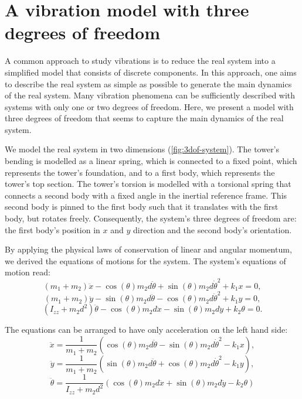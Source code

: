 \documentclass{article}
\begin{document}
\clearpage

\section{A vibration model with three degrees of freedom}
\label{sec:3dof}

A common approach to study vibrations is to reduce the real system into a simplified model that consists of discrete components. In this approach, one aims to describe the real system as simple as possible to generate the main dynamics of the real system. Many vibration phenomena can be sufficiently described with systems with only one or two degrees of freedom. Here, we present a model with three degrees of freedom that seems to capture the main dynamics of the real system.
\par 
We model the real system in two dimensions (\autoref{fig:3dof-system}). The tower's bending is modelled as a linear spring, which is connected to a fixed point, which represents the tower's foundation, and to a first body, which represents the tower's top section. The tower's torsion is modelled with a torsional spring that connects a second body with a fixed angle in the inertial reference frame. This second body is pinned to the first body such that it translates with the first body, but rotates freely. Consequently, the system's three degrees of freedom are: the first body's position in $x$ and $y$ direction and the second body's orientation.
\par 
By applying the physical laws of conservation of linear and angular momentum, we derived the equations of motions for the system. The system's equations of motion read:
\begin{equation}
    (m_1 + m_2) \ddot{x} - \cos(\theta) m_2 d \ddot{\theta} + \sin(\theta) m_2 d \dot{\theta}^2 + k_1 x = 0,\label{eq:eom-x}
\end{equation}
\begin{equation}
    (m_1 + m_2) \ddot{y} - \sin(\theta) m_2 d \ddot{\theta} - \cos(\theta) m_2 d \dot{\theta}^2 + k_1 y = 0,\label{eq:eom-y}
\end{equation}
\begin{equation}
    (I_{zz} + m_2 d^2)\ddot{\theta} - \cos(\theta) m_2 d \ddot{x} - \sin(\theta)m_2 d \ddot{y} + k_2 \theta = 0.\label{eq:eom-theta}
\end{equation}

The equations can be arranged to have only acceleration on the left hand side:
\begin{equation}
    \ddot{x} = \frac{1}{m_1 + m_2} \left( \cos(\theta) m_2 d \ddot{\theta} - \sin(\theta) m_2 d \dot{\theta}^2 - k_1 x \right),\label{eq:eom2-x}
\end{equation}
\begin{equation}
   \ddot{y} = \frac{1}{m_1 + m_2} \left(\sin(\theta) m_2 d \ddot{\theta} + \cos(\theta) m_2 d \dot{\theta}^2 - k_1 y \right),\label{eq:eom2-y}
\end{equation}
\begin{equation}
    \ddot{\theta} = \frac{1}{I_{zz} + m_2 d^2} \left(\cos(\theta) m_2 d \ddot{x} + \sin(\theta)m_2 d \ddot{y} - k_2 \theta \right) \label{eq:eom2-theta}
\end{equation}
\end{document}
